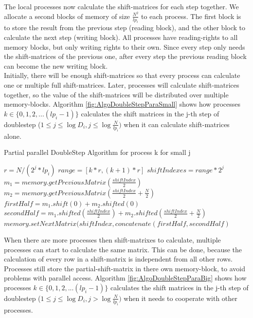 \documentclass[12pt]{article}
\begin{document}
The local processes now calculate the shift-matrices for each step together. We allocate a second blocks of memory of size $\frac{N^2}{lp_i}$ to each process. The first block is to store the result from the previous step (reading block), and the other block to calculate the next step (writing block). All processes have reading-rights to all memory blocks, but only writing rights to their own. Since every step only needs the shift-matrices of the previous one, after every step the previous reading block can become the new writing block.\\

Initially, there will be enough shift-matrices so that every process can calculate one or multiple full shift-matrices. Later, processes will calculate shift-matrices together, so the value of the shift-matrices will be distributed over multiple memory-blocks. Algorithm \ref{fig:AlgoDoubleStepParaSmall} shows how processes  $k\in \{0,1,2,...(lp_i-1)\}$ calculates the shift matrices in the j-th step of doublestep ($1 \leq j\leq \log D_i,j\leq \log \frac{N}{lp_i})$ when it can calculate shift-matrices alone.\\

\begin{algorithm}
\caption{Partial parallel DoubleStep Algorithm for process k for small j}\label{euclid}
\label{fig:AlgoDoubleStepParaSmall}
\begin{algorithmic}[1]
\State $r = N/(2^j*lp_i)$
\State $range = [k*r,(k+1)*r]$
\State $shiftIndexes = range*2^j$
      \State $m_1 = memory.getPreviousMatrix( \frac{shiftIndex}{2} )$
      \State $m_2 = memory.getPreviousMatrix( \frac{shiftIndex}{2}+\frac{N}{2} )$
      \State $firstHalf = m_1.shift(0) + m_2.shifted(0)$
      \State $secondHalf = m_1.shifted(\frac{shiftIndex}{2}) + m_2.shifted(\frac{shiftIndex}{2}+\frac{N}{2})$
      \State $memory.setNextMatrix( shiftIndex, concatenate(firstHalf,secondHalf)$
\EndFor
\end{algorithmic}
\end{algorithm}

When there are more processes then shift-matrixes to calculate, multiple processes can start to calculate the same matrix. This can be done, because the calculation of every row in a shift-matrix is independent from all other rows. Processes still store the partial-shift-matrix in there own memory-block, to avoid problems with parallel access.  Algorithm \ref{fig:AlgoDoubleStepParaBig} shows how processes  $k\in \{0,1,2,...(lp_i-1)\}$ calculates the shift matrices in the j-th step of doublestep ($1 \leq j\leq \log D_i,j> \log \frac{N}{lp_i})$ when it needs to cooperate with other processes.\\
\end{document}
